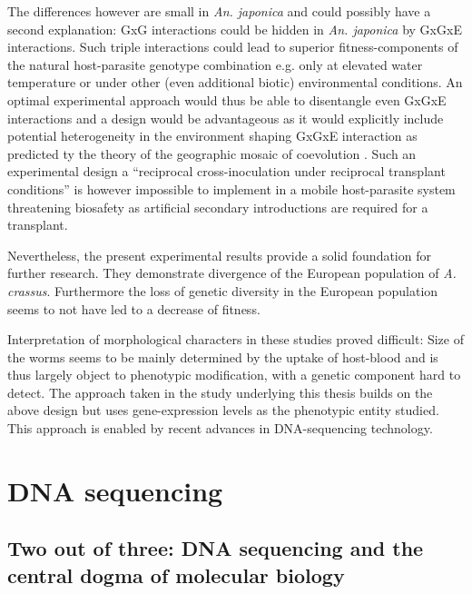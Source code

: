 The differences however are small in \textit{An. japonica} and could
possibly have a second explanation: GxG interactions could be hidden
in \textit{An. japonica} by GxGxE interactions. Such triple
interactions could lead to superior fitness-components of the natural
host-parasite genotype combination e.g. only at elevated water
temperature or under other (even additional biotic) environmental
conditions. An optimal experimental approach would thus be able to
disentangle even GxGxE interactions and a design would be advantageous
as it would explicitly include potential heterogeneity in the
environment shaping GxGxE interaction as predicted ty the theory of
the geographic mosaic of coevolution
\cite{thompson2005geographic}. Such an experimental design a
``reciprocal cross-inoculation under reciprocal transplant
conditions'' \cite{pmid18419564} is however impossible to implement in
a mobile host-parasite system threatening biosafety as artificial
secondary introductions are required for a transplant.

Nevertheless, the present experimental results provide a solid
foundation for further research. They demonstrate divergence of the
European population of \textit{A. crassus}. Furthermore the loss of
genetic diversity in the European population
\cite{wielgoss_population_2008} seems to not have led to a decrease of
fitness.

Interpretation of morphological characters in these studies proved
difficult: Size of the worms seems to be mainly determined by the
uptake of host-blood and is thus largely object to phenotypic
modification, with a genetic component hard to detect. The approach
taken in the study underlying this thesis builds on the above design
but uses gene-expression levels as the phenotypic entity studied. This
approach is enabled by recent advances in DNA-sequencing technology.

\section{DNA sequencing}

\subsection{Two out of three: DNA sequencing and the central dogma of
  molecular biology}
\label{sec:dm}



